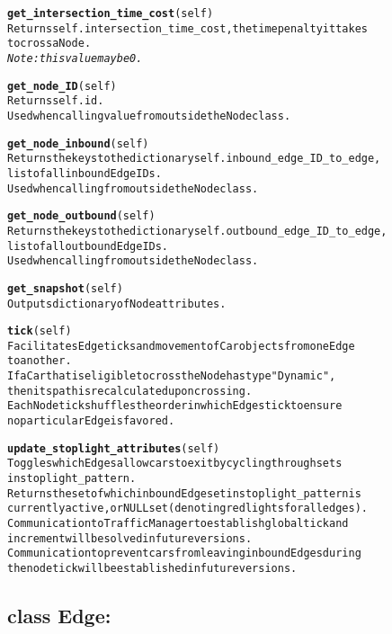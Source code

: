 \begin{alltt}
\textbf{get_intersection_time_cost}(self)
Returns self.intersection_time_cost, the time penalty it takes 
to cross a Node.
\textit{Note:  this value may be 0.}

\textbf{get_node_ID}(self)
Returns self.id.
Used when calling value from outside the Node class.

\textbf{get_node_inbound}(self)
Returns the keys to the dictionary self.inbound_edge_ID_to_edge, 
list of all inbound Edge IDs.
Used when calling from outside the Node class.

\textbf{get_node_outbound}(self)
Returns the keys to the dictionary self.outbound_edge_ID_to_edge, 
list of all outbound Edge IDs.
Used when calling from outside the Node class.

\textbf{get_snapshot}(self)
Outputs dictionary of Node attributes.

\textbf{tick}(self)
Facilitates Edge ticks and movement of Car objects from one Edge 
to another.
If a Car that is eligible to cross the Node has type "Dynamic", 
then its path is recalculated upon crossing.
Each Node tick shuffles the order in which Edges tick to ensure 
no particular Edge is favored.

\textbf{update_stoplight_attributes}(self)
Toggles which Edges allow cars to exit by cycling through sets 
in stoplight_pattern.
Returns the set of which inbound Edge set in stoplight_pattern is
currently active, or NULL set (denoting red lights for all edges).
Communication to TrafficManager to establish global tick and 
increment will be solved in future versions.
Communication to prevent cars from leaving inbound Edges during 
the node tick will be established in future versions.

\end{alltt}

\subsection{class Edge:}

